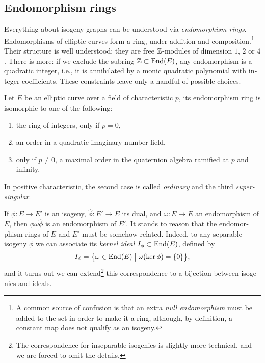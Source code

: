 \begin{otherlanguage}{english}
  
  \section{Endomorphism rings}

  Everything about isogeny graphs can be understood via
  \emph{endomorphism rings}. Endomorphisms of elliptic curves form a
  ring, under addition and composition.\footnote{A common source of
    confusion is that an extra \emph{null endomorphism} must be added
    to the set in order to make it a ring, although, by definition, a
    constant map does not qualify as an isogeny.} Their structure is
  well understood: they are free $\mathbb{Z}$-modules of dimension $1$, $2$ or
  $4$. There is more: if we exclude the subring $\mathbb{Z}\subset\mathrm{End}(E)$,
  any endomorphism is a quadratic integer, i.e., it is annihilated by
  a monic quadratic polynomial with integer coefficients. These
  constraints leave only a handful of possible choices.

  \begin{theorem}
    Let $E$ be an elliptic curve over a field of characteristic $p$,
    its endomorphism ring is isomorphic to one of the following:
    \begin{enumerate}
    \item the ring of integers, only if $p=0$,
    \item an order in a quadratic imaginary number field,
    \item only if $p\ne 0$, a maximal order in the quaternion algebra
      ramified at $p$ and infinity.
    \end{enumerate}
    In positive characteristic, the second case is called
    \emph{ordinary} and the third \emph{supersingular}.
  \end{theorem}

  If $\phi:E\to E'$ is an isogeny, $\hat\phi:E'\to E$ its dual, and
  $\omega:E\to E$ an endomorphism of $E$, then $\phi\omega\hat\phi$ is
  an endomorphism of $E'$. It stands to reason that the endomorphism
  rings of $E$ and $E'$ must be somehow related.  Indeed, to any
  separable isogeny $\phi$ we can associate its \emph{kernel ideal}
  $I_\phi\subset\mathrm{End}(E)$, defined by
  \[I_\phi = \bigl\{ \omega \in \mathrm{End}(E) \;\big\vert\; \omega(\ker\phi)
    = \{0\} \bigr\},\] %
  and it turns out we can extend\footnote{The correspondence for
    inseparable isogenies is slightly more technical, and we are
    forced to omit the details.} this correspondence to a bijection
  between isogenies and ideals.


\end{otherlanguage}
